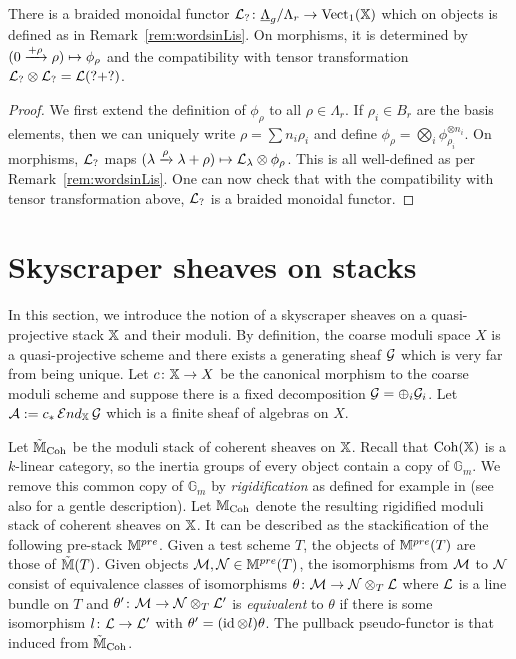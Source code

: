\documentclass[12pt]{amsart}
\begin{document}
\begin{proposition}  \label{prop:cLfunctor}
There is a braided monoidal functor $\mathcal{L}_? \colon \underline{\Lambda}_g / \Lambda_r \to \operatorname{Vect}_1(\mathbb{X})$ which on objects is defined as in Remark~\ref{rem:wordsinLis}. On morphisms, it is determined by $(0 \xrightarrow{+ \rho} \rho) \mapsto \phi_{\rho}$ and the compatibility with tensor transformation $\mathcal{L}_? \otimes \mathcal{L}_?  = \mathcal{L}(? + ?)$.
\end{proposition}
\begin{proof}
We first extend the definition of $\phi_{\rho}$ to all $\rho \in \Lambda_r$. If $\rho_i \in B_r$ are the basis elements, then we can uniquely write $\rho = \sum n_i \rho_i$ and define $\phi_{\rho}  = \bigotimes_i \phi_{\rho_i}^{\otimes n_i}$. On morphisms, $\mathcal{L}_?$ maps $(\lambda \xrightarrow{\rho} \lambda + \rho) \mapsto \mathcal{L}_{\lambda} \otimes \phi_{\rho}$. This is all well-defined as per Remark~\ref{rem:wordsinLis}. One can now check that with the compatibility with tensor transformation above, $\mathcal{L}_?$ is a braided monoidal functor.
\end{proof}


\section{Skyscraper sheaves on stacks}
\label{sec:sky}

In this section, we introduce the notion of a skyscraper sheaves on a quasi-projective stack $\mathbb{X}$ and their moduli. By definition, the coarse moduli space $X$ is a quasi-projective scheme and there exists a generating sheaf $\mathcal{G}$ which is very far from being unique. Let $c \colon \mathbb{X} \rightarrow X$ be the canonical morphism to the coarse moduli scheme and suppose there is a fixed decomposition $\mathcal{G} = \oplus_i \mathcal{G}_i$. Let $\mathcal{A} := c_* \mathop{{\mathcal{E}}nd}\nolimits_{\mathbb{X}} \mathcal{G}$ which is a finite sheaf of algebras on $X$.

Let $\tilde{\mathbb{M}}_{\operatorname{Coh}}$ be the moduli stack of coherent sheaves on $\mathbb{X}$. Recall that $\operatorname{Coh}(\mathbb{X})$ is a $k$-linear category, so the inertia groups of every object contain a copy of $\mathbb{G}_m$. We remove this common copy of $\mathbb{G}_m$ by {\em rigidification} as defined for example in \cite[Section~5]{ACV} (see also \cite[Section~2.3]{CL} for a gentle description). Let $\mathbb{M}_{\operatorname{Coh}}$ denote the resulting rigidified moduli stack of coherent sheaves on $\mathbb{X}$. It can be described as the stackification of the following pre-stack $\mathbb{M}^{pre}$. Given a test scheme $T$, the objects of $\mathbb{M}^{pre}(T)$ are those of $\tilde{\mathbb{M}}(T)$. Given objects $\mathcal{M}, \mathcal{N} \in \mathbb{M}^{pre}(T)$, the isomorphisms from $\mathcal{M}$ to $\mathcal{N}$ consist of equivalence classes of isomorphisms $\theta \colon \mathcal{M} \to \mathcal{N} \otimes_T \mathcal{L}$ where $\mathcal{L}$ is a line bundle on $T$ and $\theta' \colon \mathcal{M} \to \mathcal{N} \otimes_T \mathcal{L}'$ is {\em equivalent} to $\theta$ if there is some isomorphism $l \colon \mathcal{L} \to \mathcal{L}'$ with $\theta' = (\operatorname{id} \otimes l) \theta$. The pullback pseudo-functor is that induced from $\tilde{\mathbb{M}}_{\operatorname{Coh}}$. 
\end{document}
